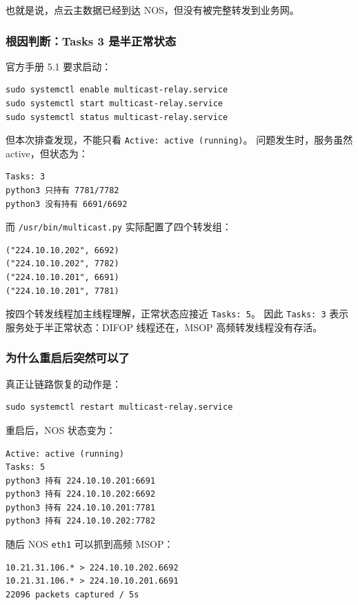 \documentclass[UTF8,11pt,a4paper]{ctexart}
\begin{document}
也就是说，点云主数据已经到达 NOS，但没有被完整转发到业务网。

\subsubsection{根因判断：Tasks 3 是半正常状态}

官方手册 5.1 要求启动：

\begin{verbatim}
sudo systemctl enable multicast-relay.service
sudo systemctl start multicast-relay.service
sudo systemctl status multicast-relay.service
\end{verbatim}

但本次排查发现，不能只看 \texttt{Active: active (running)}。
问题发生时，服务虽然 active，但状态为：

\begin{verbatim}
Tasks: 3
python3 只持有 7781/7782
python3 没有持有 6691/6692
\end{verbatim}

而 \texttt{/usr/bin/multicast.py} 实际配置了四个转发组：

\begin{verbatim}
("224.10.10.202", 6692)
("224.10.10.202", 7782)
("224.10.10.201", 6691)
("224.10.10.201", 7781)
\end{verbatim}

按四个转发线程加主线程理解，正常状态应接近 \texttt{Tasks: 5}。
因此 \texttt{Tasks: 3} 表示服务处于半正常状态：DIFOP 线程还在，MSOP 高频转发线程没有存活。

\subsubsection{为什么重启后突然可以了}

真正让链路恢复的动作是：

\begin{verbatim}
sudo systemctl restart multicast-relay.service
\end{verbatim}

重启后，NOS 状态变为：

\begin{verbatim}
Active: active (running)
Tasks: 5
python3 持有 224.10.10.201:6691
python3 持有 224.10.10.202:6692
python3 持有 224.10.10.201:7781
python3 持有 224.10.10.202:7782
\end{verbatim}

随后 NOS \texttt{eth1} 可以抓到高频 MSOP：

\begin{verbatim}
10.21.31.106.* > 224.10.10.202.6692
10.21.31.106.* > 224.10.10.201.6691
22096 packets captured / 5s
\end{verbatim}
\end{document}
